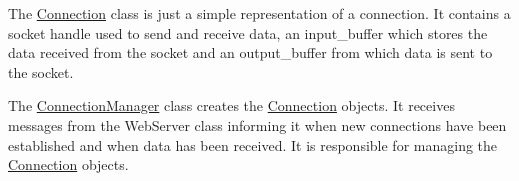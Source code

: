 The \hyperlink{class_connection_manager_1_1_connection}{Connection} class is just a simple representation of a connection. It contains a socket handle used to send and receive data, an input\-\_\-buffer which stores the data received from the socket and an output\-\_\-buffer from which data is sent to the socket.

The \hyperlink{namespace_connection_manager}{Connection\-Manager} class creates the \hyperlink{class_connection_manager_1_1_connection}{Connection} objects. It receives messages from the Web\-Server class informing it when new connections have been established and when data has been received. It is responsible for managing the \hyperlink{class_connection_manager_1_1_connection}{Connection} objects. 